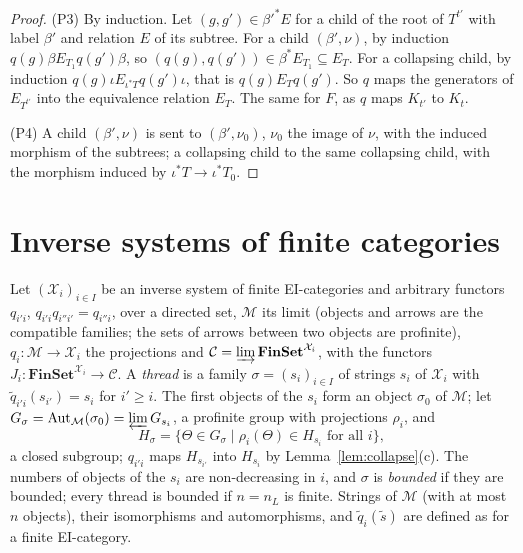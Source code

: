 \documentclass[11pt]{amsart}
\theoremstyle{definition}
\newcommand{\Fin}{\mathbf{FinSet}}
\newcommand{\Aut}{\mathrm{Aut}}
\newcommand{\cX}{\mathcal X}
\newcommand{\cC}{\mathcal C}
\newcommand{\cM}{\mathcal M}
\begin{document}
\begin{proof}
(P3) By induction. Let $(g,g')\in\beta'^*E$ for a child of the root of
$T^{t'}$ with label $\beta'$ and relation $E$ of its subtree. For a
child $(\beta',\nu)$, by induction $q(g)\beta\mathrel{E_{T_1}}q(g')
\beta$, so $(q(g),q(g'))\in\beta^*E_{T_1}\subseteq E_T$. For a
collapsing child, by induction $q(g)\iota\mathrel{E_{\iota^*T}}q(g')
\iota$, that is $q(g)\mathrel{E_T}q(g')$. So $q$ maps the generators
of $E_{T^{t'}}$ into the equivalence relation $E_T$. The same for $F$,
as $q$ maps $K_{t'}$ to $K_t$.

(P4) A child $(\beta',\nu)$ is sent to $(\beta',\nu_0)$, $\nu_0$ the
image of $\nu$, with the induced morphism of the subtrees; a
collapsing child to the same collapsing child, with the morphism
induced by $\iota^*T\to\iota^*T_0$.
\end{proof}

\section{Inverse systems of finite categories}\label{sec:inverse}

Let $(\cX_i)_{i\in I}$ be an inverse system of finite EI-categories
and arbitrary functors $q_{i'i}$, $q_{i'i}q_{i''i'}=q_{i''i}$, over a
directed set, $\cM$ its limit (objects and arrows are the compatible
families; the sets of arrows between two objects are profinite),
$q_i\colon\cM\to\cX_i$ the projections and $\cC=\varinjlim
\Fin^{\cX_i}$, with the functors $J_i\colon\Fin^{\cX_i}\to\cC$. A
\emph{thread} is a family $\sigma=(s_i)_{i\in I}$ of strings $s_i$ of
$\cX_i$ with $\tilde q_{i'i}(s_{i'})=s_i$ for $i'\ge i$. The first
objects of the $s_i$ form an object $\sigma_0$ of $\cM$; let
$G_\sigma=\Aut_\cM(\sigma_0)=\varprojlim G_{s_i}$, a profinite group
with projections $\rho_i$, and
\[
H_\sigma=\{\Theta\in G_\sigma\mid\rho_i(\Theta)\in H_{s_i}\text{ for
all }i\},
\]
a closed subgroup; $q_{i'i}$ maps $H_{s_{i'}}$ into $H_{s_i}$ by
Lemma~\ref{lem:collapse}(c). The numbers of objects of the $s_i$ are
non-decreasing in $i$, and $\sigma$ is \emph{bounded} if they are
bounded; every thread is bounded if $n=n_L$ is finite. Strings of
$\cM$ (with at most $n$ objects), their isomorphisms and
automorphisms, and $\tilde q_i(\tilde s)$ are defined as for a finite
EI-category.
\end{document}
